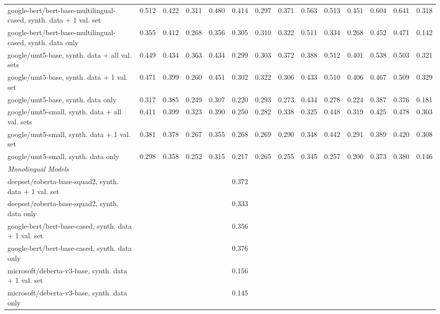 \documentclass[11pt]{article}
\begin{document}
\begin{landscape}
\begin{table}[h]
\begin{tabular}{lccccccccccccc}
google-bert/bert-base-multilingual-cased, synth. data + 1 val. set & 0.512 & 0.422 & 0.311 & 0.480 & 0.414 & 0.297 & 0.371 & 0.563 & 0.513 & 0.451 & 0.604 & 0.641 & 0.318 \\
google-bert/bert-base-multilingual-cased, synth. data only & 0.355 & 0.412 & 0.268 & 0.356 & 0.305 & 0.310 & 0.322 & 0.511 & 0.334 & 0.268 & 0.452 & 0.471 & 0.142 \\
\hline
google/umt5-base, synth. data + all val. sets & 0.449 & 0.434 & 0.363 & 0.434 & 0.299 & 0.303 & 0.372 & 0.388 & 0.512 & 0.401 & 0.538 & 0.503 & 0.321 \\
google/umt5-base, synth. data + 1 val. set & 0.471 & 0.399 & 0.260 & 0.451 & 0.302 & 0.322 & 0.306 & 0.433 & 0.510 & 0.406 & 0.467 & 0.509 & 0.329 \\
google/umt5-base, synth. data only & 0.317 & 0.385 & 0.249 & 0.307 & 0.220 & 0.293 & 0.273 & 0.434 & 0.278 & 0.224 & 0.387 & 0.376 & 0.181 \\
\hline
google/umt5-small, synth. data + all val. sets & 0.411 & 0.399 & 0.323 & 0.390 & 0.250 & 0.282 & 0.338 & 0.325 & 0.448 & 0.319 & 0.425 & 0.478 & 0.303 \\
google/umt5-small, synth. data + 1 val. set & 0.381 & 0.378 & 0.267 & 0.355 & 0.268 & 0.269 & 0.290 & 0.348 & 0.442 & 0.291 & 0.389 & 0.420 & 0.308 \\
google/umt5-small, synth. data only & 0.298 & 0.358 & 0.252 & 0.315 & 0.217 & 0.265 & 0.255 & 0.345 & 0.257 & 0.200 & 0.373 & 0.380 & 0.146 \\
\midrule
\emph{Monolingual Models} \\
\midrule
deepset/roberta-base-squad2, synth. data + 1 val. set &   &   &   &   & 0.372 &   &   &   &   &   &   &   &   \\
deepset/roberta-base-squad2, synth. data only &  &   &   &   & 0.333 &   &   &   &   &   &   &   &   \\
\hline
google-bert/bert-base-cased, synth. data + 1 val. set &   &   &   &   & 0.356 &   &   &   &   &   &   &   &   \\
google-bert/bert-base-cased, synth. data only &   &   &   &   & 0.376 &   &   &   &   &   &   &   &   \\
\hline
microsoft/deberta-v3-base, synth. data + 1 val. set &   &   &   &   & 0.156 &   &   &   &   &   &   &   &   \\
microsoft/deberta-v3-base, synth. data only &   &   &   &   & 0.145 &   &   &   &   &   &   &   &   \\    
\end{tabular}
\renewcommand{\arraystretch}{1.0}
\end{table}
\end{landscape}
    
\twocolumn
\end{document}
